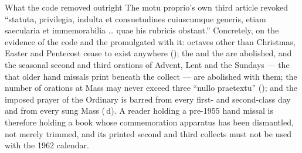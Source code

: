 \begin{caution}{What the code removed outright}
The motu proprio's own third article revoked ``statuta, privilegia, indulta et
consuetudines cuiuscumque generis, etiam saecularia et immemorabilia \dots{}
quae his rubricis obstant.'' Concretely, on the evidence of the code and the
 promulgated with it: octaves other than Christmas, Easter
and Pentecost cease to exist anywhere (); the  and the  are abolished, and the
seasonal second and third orations of Advent, Lent and the Sundays --- the
 that older hand missals print
beneath the collect --- are abolished with them; the number of orations at Mass
may never exceed three ``nullo praetextu'' (); and the imposed prayer
of the Ordinary is barred from every first- and second-class day and from every
sung Mass (\,d). A reader holding a pre-1955 hand missal is therefore
holding a book whose commemoration apparatus has been dismantled, not merely
trimmed, and its printed second and third collects must not be used with the
1962 calendar.
\end{caution}
